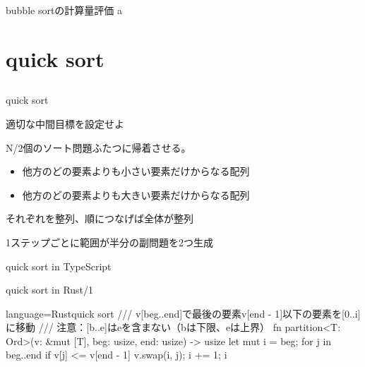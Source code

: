 \documentclass{beamer}
\begin{document}
\begin{frame}[fragile]{bubble sortの計算量評価}{}
a
\end{frame}

\section{quick sort}		%
\subsection{}

\begin{frame}[fragile]{quick sort}{}

\vfill
適切な中間目標を設定せよ

\pause
\vfill
N/2個のソート問題ふたつに帰着させる。

\begin{itemize}%
\item 他方のどの要素よりも小さい要素だけからなる配列
\item 他方のどの要素よりも大きい要素だけからなる配列
\end{itemize}
それぞれを整列、順につなげば全体が整列


\vfill
1ステップごとに範囲が半分の副問題を2つ生成

\end{frame}

\begin{frame}[fragile]{quick sort in TypeScript}{}
\end{frame}

\begin{frame}[fragile]{quick sort in Rust/1}{}
\begin{codeof}{language=Rust}{quick sort}
/// v[beg..end]で最後の要素v[end - 1]以下の要素を[0..i]に移動
/// 注意：[b..e]はeを含まない（bは下限、eは上界）
fn partition<T: Ord>(v: &mut [T], beg: usize, end: usize) -> usize {
    let mut i = beg;
    for j in beg..end {
        if v[j] <= v[end - 1] {
            v.swap(i, j);
            i += 1;
        }
    }
    i
}
\end{codeof}
\end{frame}
\end{document}
